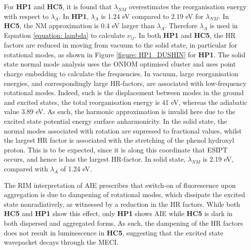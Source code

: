 For \textbf{HP1} and \textbf{HC5}, it is found that $\lambda_{NM}$ overestimates the reorganisation energy with respect to $\lambda_{A}$. In \textbf{HP1},  $\lambda_{A}$ is 1.24 eV compared to 2.19 eV for $\lambda_{NM}$. In \textbf{HC5}, the NM approximation is 0.4 eV larger than $\lambda_{A}$. Therefore $\lambda_{A}$ is used in Equation \ref{equation: lambda} to calculate $\nu_{ij}$. In both \textbf{HP1} and \textbf{HC5}, the HR factors are reduced in moving from vacuum to the solid state, in particular for rotational modes, as shown in Figure \ref{figure: HP1_DUSHIN} for \textbf{HP1}. The solid state normal mode analysis uses the ONIOM optimised cluster and uses point charge embedding to calculate the frequencies. In vacuum, large reorganisation energies, and correspondingly large HR-factors, are associated with low-frequency rotational modes. Indeed, such is the displacement between modes in the ground and excited states, the total reorganisation energy is 41 eV, whereas the adiabatic value 3.89 eV. As such, the harmonic approximation is invalid here due to the excited state potential energy surface anharmonicity. In the solid state, the normal modes associated with rotation are supressed to fractional values, whilst the largest HR factor is associated with the stretching of the phenol hydroxyl proton. This is to be expected, since it is along this coordinate that ESIPT occurs, and hence is has the largest HR-factor. In solid state, $\lambda_{NM}$ is 2.19 eV, compared with $\lambda_{A}$ of 1.24 eV. 

The RIM interpretation of AIE prescribes that switch-on of fluorescence upon aggregation is due to dampening of rotational modes, which dissipate the excited state nonradiatively, as witnessed by a reduction in the HR factors. While both \textbf{HC5} and \textbf{HP1} show this effect, only \textbf{HP1} shows AIE while \textbf{HC5} is dark in both dispersed and aggregated forms. As such, the dampening of the HR factors does not result in luminescence in \textbf{HC5}, suggesting that the excited state wavepacket decays through the MECI. 

